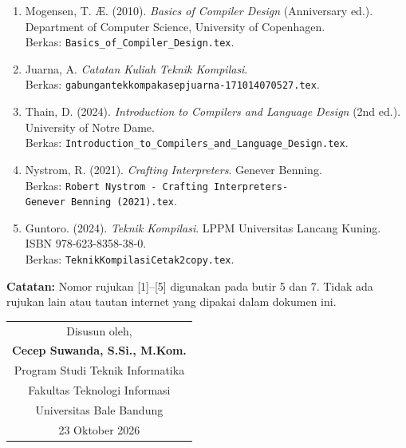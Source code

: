 \documentclass[12pt,a4paper]{article}
\begin{document}
\begin{enumerate}[leftmargin=*]
  \item Mogensen, T. {\AE}. (2010). \textit{Basics of Compiler Design} (Anniversary ed.). Department of Computer Science, University of Copenhagen.\\
  Berkas: \texttt{Basics\_of\_Compiler\_Design.tex}.

  \item Juarna, A. \textit{Catatan Kuliah Teknik Kompilasi}.\\
  Berkas: \texttt{gabungantekkompakasepjuarna-\allowbreak 171014070527.tex}.

  \item Thain, D. (2024). \textit{Introduction to Compilers and Language Design} (2nd ed.). University of Notre Dame.\\
  Berkas: \texttt{Introduction\_to\_Compilers\_and\_\allowbreak Language\_Design.tex}.

  \item Nystrom, R. (2021). \textit{Crafting Interpreters}. Genever Benning.\\
  Berkas: \texttt{Robert Nystrom - Crafting Interpreters-}\\
  \texttt{Genever Benning (2021).tex}.

  \item Guntoro. (2024). \textit{Teknik Kompilasi}. LPPM Universitas Lancang Kuning. ISBN 978-623-8358-38-0.\\
  Berkas: \texttt{TeknikKompilasiCetak2copy.tex}.
\end{enumerate}

\vspace{0.3cm}

\noindent\textbf{Catatan:} Nomor rujukan [1]--[5] digunakan pada butir 5 dan 7. Tidak ada rujukan lain atau tautan internet yang dipakai dalam dokumen ini.

\vspace{1cm}

\begin{flushright}
\begin{tabular}{c}
Disusun oleh,\\[2cm]
\textbf{Cecep Suwanda, S.Si., M.Kom.}\\
Program Studi Teknik Informatika\\
Fakultas Teknologi Informasi\\
Universitas Bale Bandung\\[0.5cm]
23 Oktober 2026
\end{tabular}
\end{flushright}
\end{document}
